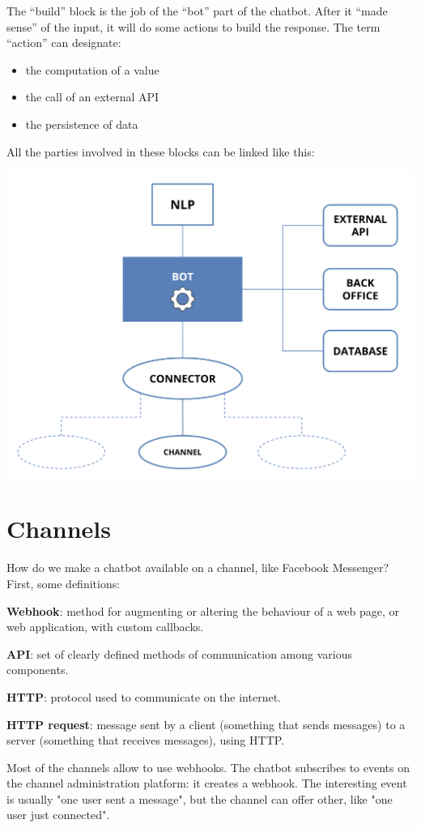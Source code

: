 \documentclass{article}
\begin{document}
The “build” block is the job of the “bot” part of the chatbot. After it “made sense” of the input, it will do some actions to build the response.
The term “action” can designate: 
\begin{itemize}
    \item the computation of a value
    \item the call of an external API
    \item the persistence of data
\end{itemize}

All the parties involved in these blocks can be linked like this:

\includegraphics[scale=0.4]{images/chatbot_archi.png}
\newpage
\section{Channels}
How do we make a chatbot available on a channel, like Facebook Messenger?
\newline
\newline
First, some definitions:
\begin{description}
    \item \textbf{Webhook}: method for augmenting or altering the behaviour of a web page, or web application, with custom callbacks.
    \item \textbf{API}: set of clearly defined methods of communication among various components.
    \item \textbf{HTTP}: protocol used to communicate  on the internet.
    \item \textbf{HTTP request}: message sent by a client (something that sends messages) to a server (something that receives messages), using HTTP.\\
\end{description}
Most of the channels allow to use webhooks. The chatbot subscribes to events on the channel administration platform: it creates a webhook. The interesting event is usually "one user sent a message", but the channel can offer other, like "one user just connected".
\end{document}
